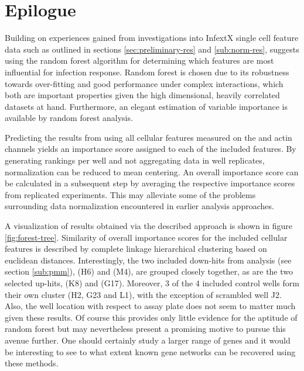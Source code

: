 \chapter{Epilogue}
\label{ch:epilogue}
\renewcommand{\thefigure}{E.\arabic{figure}}

Building on experiences gained from investigations into InfextX single cell feature data such as outlined in sections \ref{sec:preliminary-res} and \ref{sub:norm-res}, \citet{Drewek2015} suggests using the random forest algorithm \citep{Breiman2001,Liaw2002} for determining which features are most influential for infection response. Random forest is chosen due to its robustness towards over-fitting and good performance under complex interactions, which both are important properties given the high dimensional, heavily correlated datasets at hand. Furthermore, an elegant estimation of variable importance is available by random forest analysis.

Predicting the results from  using all cellular features measured on the  and actin channels yields an importance score assigned to each of the included features. By generating rankings per well and not aggregating data in well replicates, normalization can be reduced to mean centering. An overall importance score can be calculated in a subsequent step by averaging the respective importance scores from replicated experiments. This may alleviate some of the problems surrounding data normalization encountered in earlier analysis approaches.



A visualization of results obtained via the described approach is shown in figure \ref{fig:forest-tree}. Similarity of overall importance scores for the  included cellular features is described by complete linkage hierarchical clustering based on euclidean distances. Interestingly, the two included down-hits from  analysis (see section \ref{sub:pmm}),  (H6) and  (M4), are grouped closely together, as are the two selected up-hits,  (K8) and  (G17). Moreover, 3 of the 4 included control wells form their own cluster (H2, G23 and L1), with the exception of scrambled well J2. Also, the well location with respect to assay plate does not seem to matter much given these results. Of course this provides only little evidence for the aptitude of random forest but may nevertheless present a promising motive to pursue this avenue further. One should certainly study a larger range of genes and it would be interesting to see to what extent known gene networks can be recovered using these methods.

